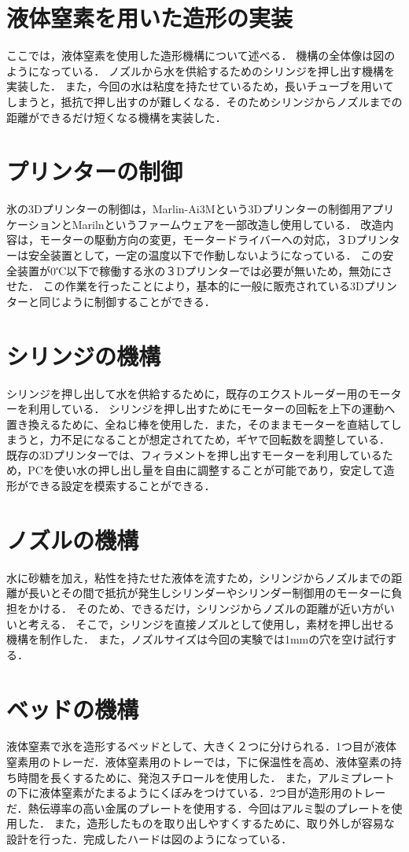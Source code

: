 \section{液体窒素を用いた造形の実装}
\label{sec:paragraph}
ここでは，液体窒素を使用した造形機構について述べる．
機構の全体像は図のようになっている．
ノズルから水を供給するためのシリンジを押し出す機構を実装した．
また，今回の水は粘度を持たせているため，長いチューブを用いてしまうと，抵抗で押し出すのが難しくなる．そのためシリンジからノズルまでの距離ができるだけ短くなる機構を実装した．

\section{プリンターの制御}
\label{sec:paragraph}
氷の3Dプリンターの制御は，Marlin-Ai3Mという3Dプリンターの制御用アプリケーションとMarilnというファームウェアを一部改造し使用している．
改造内容は，モーターの駆動方向の変更，モータードライバーへの対応，３Dプリンターは安全装置として，一定の温度以下で作動しないようになっている．
この安全装置が0℃以下で稼働する氷の３Dプリンターでは必要が無いため，無効にさせた．
この作業を行ったことにより，基本的に一般に販売されている3Dプリンターと同じように制御することができる．

\section{シリンジの機構}
\label{sec:paragraph}
シリンジを押し出して水を供給するために，既存のエクストルーダー用のモーターを利用している．
シリンジを押し出すためにモーターの回転を上下の運動へ置き換えるために、全ねじ棒を使用した．また，そのままモーターを直結してしまうと，力不足になることが想定されてため，ギヤで回転数を調整している．
既存の3Dプリンターでは、フィラメントを押し出すモーターを利用しているため，PCを使い水の押し出し量を自由に調整することが可能であり，安定して造形ができる設定を模索することができる．

\section{ノズルの機構}
\label{sec:paragraph}
水に砂糖を加え，粘性を持たせた液体を流すため，シリンジからノズルまでの距離が長いとその間で抵抗が発生しシリンダーやシリンダー制御用のモーターに負担をかける．
そのため、できるだけ，シリンジからノズルの距離が近い方がいいと考える．
そこで，シリンジを直接ノズルとして使用し，素材を押し出せる機構を制作した．
また，ノズルサイズは今回の実験では1mmの穴を空け試行する．


\section{ベッドの機構}
\label{sec:paragraph}
液体窒素で氷を造形するベッドとして、大きく２つに分けられる．1つ目が液体窒素用のトレーだ．液体窒素用のトレーでは，下に保温性を高め、液体窒素の持ち時間を長くするために、発泡スチロールを使用した．
また，アルミプレートの下に液体窒素がたまるようにくぼみをつけている．2つ目が造形用のトレーだ．熱伝導率の高い金属のプレートを使用する．今回はアルミ製のプレートを使用した．
また，造形したものを取り出しやすくするために、取り外しが容易な設計を行った．完成したハードは図のようになっている．


